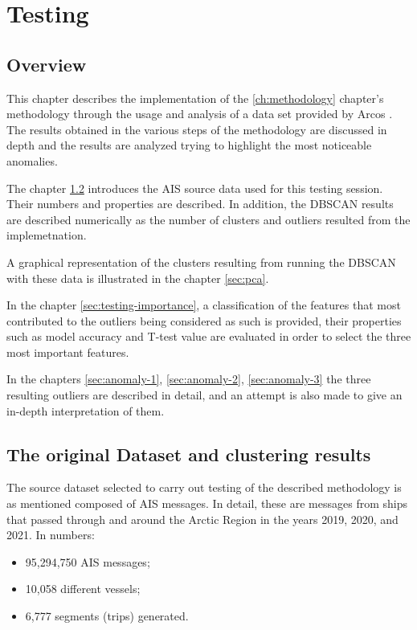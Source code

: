 \chapter{Testing}
\label{ch:testing}

\section{Overview}

This chapter describes the implementation of the \ref{ch:methodology} chapter's methodology through the usage and analysis of a data set provided by Arcos \cite{arcos}. The results obtained in the various steps of the methodology are discussed in depth and the results are analyzed trying to highlight the most noticeable anomalies.

The chapter \ref{sec:testing-dataset} introduces the AIS source data used for this testing session. Their numbers and properties are described. In addition, the DBSCAN results are described numerically as the number of clusters and outliers resulted from the implemetnation.

A graphical representation of the clusters resulting from running the DBSCAN with these data is illustrated in the chapter \ref{sec:pca}.

In the chapter \ref{sec:testing-importance}, a classification of the features that most contributed to the outliers being considered as such is provided, their properties such as model accuracy and T-test value are evaluated in order to select the three most important features.

In the chapters \ref{sec:anomaly-1}, \ref{sec:anomaly-2}, \ref{sec:anomaly-3} the three resulting outliers are described in detail, and an attempt is also made to give an in-depth interpretation of them.

\clearpage
\section{The original Dataset and clustering results}
\label{sec:testing-dataset}
The source dataset selected to carry out testing of the described methodology is as mentioned composed of AIS messages.
In detail, these are messages from ships that passed through and around the Arctic Region in the years 2019, 2020, and 2021.
In numbers:
\begin{itemize}
\item 95,294,750 AIS messages;
\item 10,058 different vessels;
\item 6,777 segments (trips) generated.
\end{itemize}

